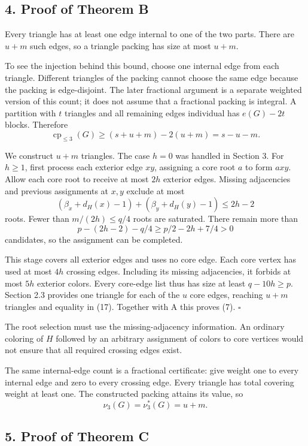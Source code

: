 \documentclass[english,11pt,a4paper]{article}
\begin{document}
\subsection{4. Proof of Theorem B}\label{proof-of-theorem-b}

Every triangle has at least one edge internal to one of the two parts.
There are \(u+m\) such edges, so a triangle packing has size at most
\(u+m\).

To see the injection behind this bound, choose one internal edge from
each triangle. Different triangles of the packing cannot choose the same
edge because the packing is edge-disjoint. The later fractional argument
is a separate weighted version of this count; it does not assume that a
fractional packing is integral. A partition with \(t\) triangles and all
remaining edges individual has \(e(G)-2t\) blocks. Therefore \[
\operatorname{cp}_{\le3}(G)\ge(s+u+m)-2(u+m)=s-u-m. \tag{17}
\]

We construct \(u+m\) triangles. The case \(h=0\) was handled in Section
3. For \(h\ge1\), first process each exterior edge \(xy\), assigning a
core root \(a\) to form \(axy\). Allow each core root to receive at most
\(2h\) exterior edges. Missing adjacencies and previous assignments at
\(x,y\) exclude at most \[
(\beta_x+d_H(x)-1)+(\beta_y+d_H(y)-1)\le2h-2
\] roots. Fewer than \(m/(2h)\le q/4\) roots are saturated. There remain
more than \[
p-(2h-2)-q/4\ge p/2-2h+7/4>0
\] candidates, so the assignment can be completed.

This stage covers all exterior edges and uses no core edge. Each core
vertex has used at most \(4h\) crossing edges. Including its missing
adjacencies, it forbids at most \(5h\) exterior colors. Every core-edge
list thus has size at least \(q-10h\ge p\). Section 2.3 provides one
triangle for each of the \(u\) core edges, reaching \(u+m\) triangles
and equality in (17). Together with A this proves (7). \(\square\)

The root selection must use the missing-adjacency information. An
ordinary coloring of \(H\) followed by an arbitrary assignment of colors
to core vertices would not ensure that all required crossing edges
exist.

The same internal-edge count is a fractional certificate: give weight
one to every internal edge and zero to every crossing edge. Every
triangle has total covering weight at least one. The constructed packing
attains its value, so \[
\nu_3(G)=\nu_3^*(G)=u+m. \tag{18}
\]

\subsection{5. Proof of Theorem C}\label{proof-of-theorem-c}
\end{document}
